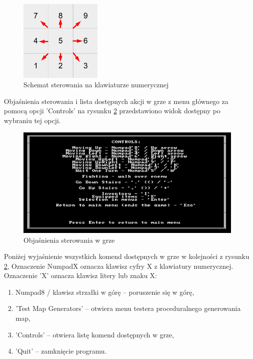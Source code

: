 \documentclass[12pt,twoside]{article}
\begin{document}
\FloatBarrier
\begin{figure}[h]
	\centering
	\includegraphics[width=4cm]{images/custom/numpad_controls.png}
	\caption{Schemat sterowania na klawiaturze numerycznej}
	\label{numpad_controls}
\end{figure}
\FloatBarrier

Objaśnienia sterowania i lista dostępnych akcji w grze z menu głównego za pomocą opcji 'Controls' na rysunku \ref{mygame:scr2} przedstawiono widok dostępny po wybraniu tej opcji.

\FloatBarrier
\begin{figure}[h]
	\centering
	\includegraphics[width=16cm]{images/mygame/scr2.png}
	\caption{Objaśnienia sterowania w grze}
	\label{mygame:scr2}
\end{figure}
\FloatBarrier


Poniżej wyjaśnienie wszystkich komend dostępnych w grze w kolejności z rysunku \ref{mygame:scr2}, Oznaczenie NumpadX oznacza klawisz cyfry X z klawiatury numerycznej. Oznaczenie 'X' oznacza klawisz litery lub znaku X:

\begin{enumerate}
	\item Numpad8 / klawisz strzałki w górę -- poruszenie się w górę,
	\item 'Test Map Generators' -- otwiera menu testera proceduralnego generowania map,			
	\item 'Controls' -- otwiera listę komend dostępnych w grze,
	\item 'Quit' -- zamknięcie programu.
\end{enumerate}
\end{document}
